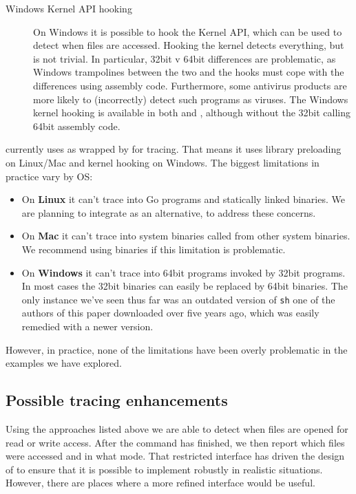 \begin{description}
\item[Windows Kernel API hooking] On Windows it is possible to hook the Kernel API, which can be used to detect when files are accessed. Hooking the kernel detects everything, but is not trivial. In particular, 32bit v 64bit differences are problematic, as Windows trampolines between the two and the hooks must cope with the differences using assembly code. Furthermore, some antivirus products are more likely to (incorrectly) detect such programs as viruses. The Windows kernel hooking is available in both \Fsatrace and \libbigbro, although without the 32bit calling 64bit assembly code.
\end{description}

\Rattle currently uses \Fsatrace as wrapped by \Shake for tracing. That means it uses library preloading on Linux/Mac and kernel hooking on Windows. The biggest limitations in practice vary by OS:

\begin{itemize}
\item On \textbf{Linux} it can't trace into Go programs and statically linked binaries. We are planning to integrate \libbigbro as an alternative, to address these concerns.
\item On \textbf{Mac} it can't trace into system binaries called from other system binaries. We recommend using \Nix binaries if this limitation is problematic.
\item On \textbf{Windows} it can't trace into 64bit programs invoked by 32bit programs. In most cases the 32bit binaries can easily be replaced by 64bit binaries. The only instance we've seen thus far was an outdated version of \texttt{sh} one of the authors of this paper downloaded over five years ago, which was easily remedied with a newer version.
\end{itemize}

However, in practice, none of the limitations have been overly problematic in the examples we have explored.

\subsection{Possible tracing enhancements}

Using the approaches listed above we are able to detect when files are opened for read or write access. After the command has finished, we then report which files were accessed and in what mode. That restricted interface has driven the design of \Rattle to ensure that it is possible to implement \Rattle robustly in realistic situations. However, there are places where a more refined interface would be useful.

